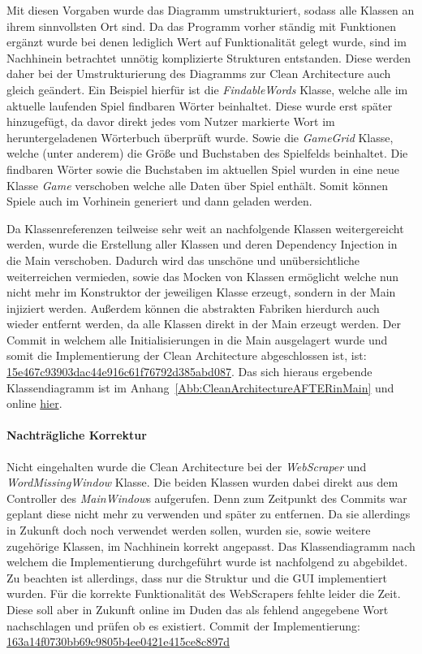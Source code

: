 Mit diesen Vorgaben wurde das Diagramm umstrukturiert, sodass alle Klassen an ihrem sinnvollsten Ort sind. Da das Programm vorher ständig mit Funktionen ergänzt wurde bei denen lediglich Wert auf Funktionalität gelegt wurde, sind im Nachhinein betrachtet unnötig komplizierte Strukturen entstanden. Diese werden daher bei der Umstrukturierung des Diagramms zur Clean Architecture auch gleich geändert. 
Ein Beispiel hierfür ist die \textit{FindableWords} Klasse, welche alle im aktuelle laufenden Spiel findbaren Wörter beinhaltet. Diese wurde erst später hinzugefügt, da davor direkt jedes vom Nutzer markierte Wort im heruntergeladenen Wörterbuch überprüft wurde. Sowie die \textit{GameGrid} Klasse, welche (unter anderem) die Größe und Buchstaben des Spielfelds beinhaltet. Die findbaren Wörter sowie die Buchstaben im aktuellen Spiel wurden in eine neue Klasse \textit{Game} verschoben welche alle Daten über Spiel enthält. Somit können Spiele auch im Vorhinein generiert und dann geladen werden.


Da Klassenreferenzen teilweise sehr weit an nachfolgende Klassen \glqq weitergereicht\grqq{} werden, wurde die Erstellung aller Klassen und deren Dependency Injection in die Main verschoben. Dadurch wird das unschöne und unübersichtliche weiterreichen vermieden, sowie das Mocken von Klassen ermöglicht welche nun nicht mehr im Konstruktor der jeweiligen Klasse erzeugt, sondern in der Main injiziert werden. Außerdem können die abstrakten Fabriken hierdurch auch wieder entfernt werden, da alle Klassen direkt in der Main erzeugt werden. Der Commit in welchem alle Initialisierungen in die Main ausgelagert wurde und somit die Implementierung der Clean Architecture abgeschlossen ist, ist: \href{https://github.com/EinToni/Wortfinder/commit/15e467c93903dac44e916c61f76792d385abd087}{15e467c93903dac44e916c61f76792d385abd087}. Das sich hieraus ergebende Klassendiagramm ist im Anhang~\ref{Abb:CleanArchitectureAFTERinMain} und online \href{https://github.com/EinToni/WortfinderDoku/blob/main/Bilder/CleanArchitectureAFTERinMain.png}{hier}.


\paragraph{Nachträgliche Korrektur}
Nicht eingehalten wurde die Clean Architecture bei der \textit{WebScraper} und \textit{WordMissingWindow} Klasse. Die beiden Klassen wurden dabei direkt aus dem Controller des \textit{MainWindow}s aufgerufen. Denn zum Zeitpunkt des Commits war geplant diese nicht mehr zu verwenden und später zu entfernen. Da sie allerdings in Zukunft doch noch verwendet werden sollen, wurden sie, sowie weitere zugehörige Klassen, im Nachhinein korrekt angepasst. Das Klassendiagramm nach welchem die Implementierung durchgeführt wurde ist nachfolgend zu abgebildet. Zu beachten ist allerdings, dass nur die Struktur und die GUI implementiert wurden. Für die korrekte Funktionalität des WebScrapers fehlte leider die Zeit. Diese soll aber in Zukunft online im Duden das als fehlend angegebene Wort nachschlagen und prüfen ob es existiert. Commit der Implementierung: \href{https://github.com/EinToni/Wortfinder/commit/163a14f0730bb69c9805b4ee0421e415ce8c897d}{163a14f0730bb69c9805b4ee0421e415ce8c897d}

